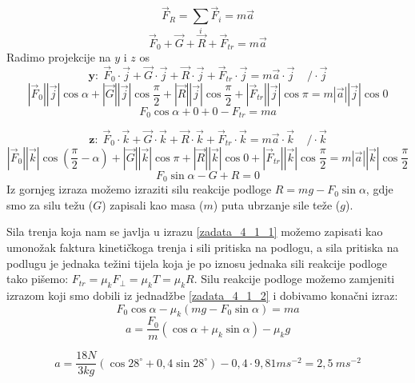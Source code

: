 

$$ \vec{F}_R=\sum_i \vec{F}_i=m\vec{a}$$
$$\vec{F}_0+\vec{G}+\vec{R}+\vec{F}_{tr}=m\vec{a} $$
Radimo projekcije na $y$ i $z$ os
$$ \textbf{y:}\ \ \vec{F}_0\cdot\vec{j}+\vec{G}\cdot\vec{j}+\vec{R}\cdot\vec{j} + \vec{F}_{tr}\cdot\vec{j}= m\vec{a}\cdot\vec{j}\ \ \ \ \  /\cdot\vec{j} $$
$$ |\vec{F}_0||\vec{j}|\cos\alpha  + |\vec{G}||\vec{j}|\cos \frac{\pi}{2}  +  |\vec{R}||\vec{j}|\cos \frac{\pi}{2} +  |\vec{F}_{tr}||\vec{j}|\cos\pi
= m|\vec{a}||\vec{j}|\cos0 $$
\begin{equation}
 F_0\cos\alpha+ 0 +0 -F_{tr}=ma 
 \label{zadata_4_1_1}
\end{equation}
 


$$  \textbf{z:}\ \ \vec{F}_0\cdot\vec{k} +  \vec{G}\cdot\vec{k}  + \vec{R}\cdot\vec{k} + \vec{F}_{tr}\cdot\vec{k} = m \vec{a}\cdot\vec{k} \ \ \ \ \  /\cdot\vec{k} $$
$$   |\vec{F}_0||\vec{k}|\cos(\frac{\pi}{2}-\alpha) +|\vec{G}||\vec{k}|\cos\pi +  |\vec{R}||\vec{k}|\cos0 + 
|\vec{F}_{tr}||\vec{k}|\cos\frac{\pi}{2}=m|\vec{a}||\vec{k}|\cos\frac{\pi}{2} $$
\begin{equation}
F_0\sin\alpha-G + R =0
\label{zadata_4_1_2}
\end{equation}
Iz gornjeg izraza možemo izraziti silu reakcije podloge
$R=mg-F_0\sin\alpha$, gdje smo za silu težu ($G$) zapisali kao masa ($m$) puta ubrzanje sile teže ($g$). 

Sila trenja koja nam se javlja u izrazu \ref{zadata_4_1_1} možemo zapisati kao umonožak 
faktura kinetičkoga trenja i sili pritiska na podlogu, a sila pritiska na podlugu je jednaka težini tijela koja je po iznosu jednaka sili reakcije 
podloge tako pišemo:
$F_{tr}=\mu_k F_{\bot}=\mu_k T=\mu_k R$. 
Silu reakcije podloge možemo zamjeniti izrazom koji smo dobili iz jednadžbe \ref{zadata_4_1_2} i dobivamo konačni izraz:
$$
F_0\cos\alpha-\mu_k(mg-F_0\sin\alpha)=ma
$$
$$ a=\frac{F_0}{m}\left(\cos\alpha + \mu_k\sin\alpha\right) -\mu_k g $$

$$a = \frac{18N}{3kg}\left(\cos28^\circ + 0,4\sin28^\circ  \right) -0,4\cdot 9,81ms^{-2} =2,5\ ms^{-2} $$





